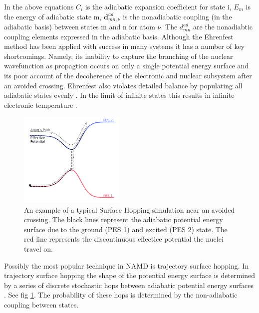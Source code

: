 In the above equations $C_{i}$ is the adiabatic expansion coefficient for state i, $E_{m}$ is the energy of adiabatic state m, $\textbf{d}_{mn, \nu}^{ad}$ is the nonadiabatic coupling (in the adiabatic basis) between states m and n for atom $\nu$. The $d_{mn}^{ad}$ are the nonadiabtic coupling elements expressed in the adiabatic basis.
Although the Ehrenfest method has been applied with success in many systems \cite{Li2005Aug, Saita2012Dec, Kohen1998Sep} it has a number of key shortcomings. Namely, its inability to capture the branching of the nuclear wavefunction as propagtion occurs on only a single potential energy surface and its poor account of the decoherence of the electronic and nuclear subsystem after an avoided crossing. Ehrenfest also violates detailed balance by populating all adiabatic states evenly \cite{tully_perspective:_2012, john_c._tully_nonadiabatic_nodate}. In the limit of infinite states this results in infinite electronic temperature \cite{parandekar_detailed_2006}.
\newpage
\begin{figure}
  \includegraphics[width=0.45\textwidth]{./img/SH_hop.png}
  \caption{\label{fig:SH_diag}An example of a typical Surface Hopping simulation near an avoided crossing. The black lines represent the adiabatic potential energy surface due to the ground (PES 1) and excited (PES 2) state. The red line represents the discontinuous effectice potential the nuclei travel on.}
\end{figure}
\noindent Possibly the most popular technique in NAMD is trajectory surface hopping. In trajectory surface hopping the shape of the potential energy surface is determined by a series of discrete stochastic hops between adiabatic potential energy surfaces \cite{tully_perspective:_2012}. See fig \ref{fig:SH_diag}.  The probability of these hops is determined by the non-adiabatic coupling between states.

